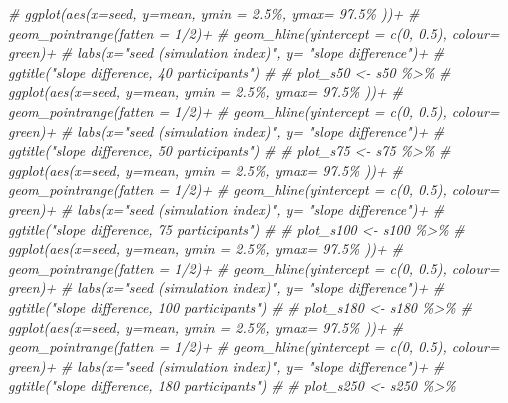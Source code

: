 \documentclass[
]{article}
\newenvironment{Shaded}{\begin{snugshade}}{\end{snugshade}}
\newcommand{\CommentTok}[1]{\textcolor[rgb]{0.56,0.35,0.01}{\textit{#1}}}
\begin{document}
\begin{Shaded}
\begin{Highlighting}[]
\CommentTok{\#   ggplot(aes(x=seed, y=mean, ymin = \textasciigrave{}2.5\%\textasciigrave{}, ymax= \textasciigrave{}97.5\%\textasciigrave{} ))+}
\CommentTok{\#   geom\_pointrange(fatten = 1/2)+}
\CommentTok{\#   geom\_hline(yintercept = c(0, 0.5), colour= \textquotesingle{}green\textquotesingle{})+}
\CommentTok{\#   labs(x="seed (simulation index)", y= "slope difference")+}
\CommentTok{\#   ggtitle("slope difference, 40 participants")}
\CommentTok{\# }
\CommentTok{\# plot\_s50 \textless{}{-} s50 \%\textgreater{}\% }
\CommentTok{\#   ggplot(aes(x=seed, y=mean, ymin = \textasciigrave{}2.5\%\textasciigrave{}, ymax= \textasciigrave{}97.5\%\textasciigrave{} ))+}
\CommentTok{\#   geom\_pointrange(fatten = 1/2)+}
\CommentTok{\#   geom\_hline(yintercept = c(0, 0.5), colour= \textquotesingle{}green\textquotesingle{})+}
\CommentTok{\#   labs(x="seed (simulation index)", y= "slope difference")+}
\CommentTok{\#   ggtitle("slope difference, 50 participants")}
\CommentTok{\# }
\CommentTok{\# plot\_s75 \textless{}{-} s75 \%\textgreater{}\% }
\CommentTok{\#   ggplot(aes(x=seed, y=mean, ymin = \textasciigrave{}2.5\%\textasciigrave{}, ymax= \textasciigrave{}97.5\%\textasciigrave{} ))+}
\CommentTok{\#   geom\_pointrange(fatten = 1/2)+}
\CommentTok{\#   geom\_hline(yintercept = c(0, 0.5), colour= \textquotesingle{}green\textquotesingle{})+}
\CommentTok{\#   labs(x="seed (simulation index)", y= "slope difference")+}
\CommentTok{\#   ggtitle("slope difference, 75 participants")}
\CommentTok{\# }
\CommentTok{\# plot\_s100 \textless{}{-} s100 \%\textgreater{}\% }
\CommentTok{\#   ggplot(aes(x=seed, y=mean, ymin = \textasciigrave{}2.5\%\textasciigrave{}, ymax= \textasciigrave{}97.5\%\textasciigrave{} ))+}
\CommentTok{\#   geom\_pointrange(fatten = 1/2)+}
\CommentTok{\#   geom\_hline(yintercept = c(0, 0.5), colour= \textquotesingle{}green\textquotesingle{})+}
\CommentTok{\#   labs(x="seed (simulation index)", y= "slope difference")+}
\CommentTok{\#   ggtitle("slope difference, 100 participants")}
\CommentTok{\# }
\CommentTok{\# plot\_s180 \textless{}{-} s180 \%\textgreater{}\% }
\CommentTok{\#   ggplot(aes(x=seed, y=mean, ymin = \textasciigrave{}2.5\%\textasciigrave{}, ymax= \textasciigrave{}97.5\%\textasciigrave{} ))+}
\CommentTok{\#   geom\_pointrange(fatten = 1/2)+}
\CommentTok{\#   geom\_hline(yintercept = c(0, 0.5), colour= \textquotesingle{}green\textquotesingle{})+}
\CommentTok{\#   labs(x="seed (simulation index)", y= "slope difference")+}
\CommentTok{\#   ggtitle("slope difference, 180 participants")}
\CommentTok{\#   }
\CommentTok{\# plot\_s250 \textless{}{-} s250 \%\textgreater{}\% }

\end{Highlighting}
\end{Shaded}
\end{document}

